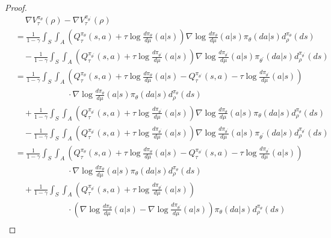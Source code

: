 \documentclass{amsart}
\theoremstyle{definition}
\begin{document}
\begin{proof}
\begin{align}
&  \quad \ \nabla V_\tau^{\pi_\theta}(\rho) - \nabla V_\tau^{\pi_{\theta^\prime}}(\rho) \nonumber\\
& = \frac{1}{1-\gamma}\int_{S} \int_{A} \left(Q^{\pi_\theta}_\tau(s,a) + \tau \log \frac{d \pi_{\theta}}{d \mu}(a|s)\right)\nabla \log \frac{d\pi_\theta}{d \mu}(a| s)\pi_{\theta}(da|s)d_\rho^{\pi_{\theta}}(ds) \nonumber \\
& \quad - \frac{1}{1-\gamma}\int_{S} \int_{A} \left(Q^{\pi_{\theta^\prime}}_\tau(s,a) + \tau \log \frac{d \pi_{\theta^\prime}}{d \mu}(a|s)\right) \nabla \log \frac{d\pi_{\theta^\prime}}{d \mu}(a| s)\pi_{\theta^\prime}(da|s)d_\rho^{\pi_{\theta^\prime}}(ds) \nonumber\\
& = \frac{1}{1-\gamma}\int_{S} \int_{A} \left(Q^{\pi_\theta}_\tau(s,a) + \tau \log \frac{d \pi_{\theta}}{d \mu}(a|s) - Q^{\pi_{\theta^\prime}}_\tau(s,a) - \tau \log \frac{d \pi_{\theta^\prime}}{d \mu}(a|s)\right)\nonumber\\
& \qquad \qquad \qquad \ \cdot \nabla \log \frac{d\pi_\theta}{d \mu}(a| s)\pi_{\theta}(da|s)d_\rho^{\pi_{\theta}}(ds) \nonumber \\
& \quad +  \frac{1}{1-\gamma}\int_{S} \int_{A} \left(Q^{\pi_{\theta^\prime}}_\tau(s,a) + \tau \log \frac{d \pi_{\theta^\prime}}{d \mu}(a|s)\right)\nabla \log \frac{d\pi_{\theta}}{d \mu}(a| s)\pi_{\theta}(da|s)d_\rho^{\pi_{\theta}}(ds) \nonumber\\
& \quad - \frac{1}{1-\gamma}\int_{S} \int_{A} \left(Q^{\pi_{\theta^\prime}}_\tau(s,a) + \tau \log \frac{d \pi_{\theta^\prime}}{d \mu}(a|s)\right)\nabla \log \frac{d\pi_{\theta^\prime}}{d \mu}(a| s)\pi_{\theta^\prime}(da|s)d_\rho^{\pi_{\theta^\prime}}(ds) \nonumber\\
& = \frac{1}{1-\gamma}\int_{S} \int_{A} \left(Q^{\pi_\theta}_\tau(s,a) + \tau \log \frac{d \pi_{\theta}}{d \mu}(a|s) - Q^{\pi_{\theta^\prime}}_\tau(s,a) - \tau \log \frac{d \pi_{\theta^\prime}}{d \mu}(a|s)\right) \nonumber\\
& \qquad \qquad \qquad \ \cdot \nabla \log \frac{d\pi_\theta}{d \mu}(a| s)\pi_{\theta}(da|s)d_\rho^{\pi_{\theta}}(ds) \nonumber \\
& \quad + \frac{1}{1-\gamma}\int_{S} \int_{A} \left(Q^{\pi_{\theta^\prime}}_\tau(s,a) + \tau \log \frac{d \pi_{\theta^\prime}}{d \mu}(a|s)\right) \nonumber \\
& \qquad \qquad \qquad \ \cdot\left(\nabla \log \frac{d\pi_{\theta}}{d \mu}(a| s) - \nabla \log \frac{d\pi_{\theta^\prime}}{d \mu}(a| s)\right)\pi_{\theta}(da|s)d_\rho^{\pi_{\theta}}(ds) \nonumber\\

\end{align}
\end{proof}
\end{document}
